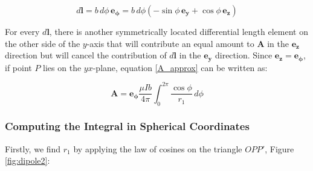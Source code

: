 \begin{equation}
    d\mathbf{l} = b \, d\phi \, \mathbf{e_\phi} 
    = b \, d\phi \left(- \sin\phi \, \mathbf{e_y} 
    + \cos\phi \, \mathbf{e_z}\right)
    \label{eq:dl}
\end{equation}

For every $d\mathbf{l}$, there is another 
symmetrically located differential length element on 
the other side of the $y$-axis that will contribute 
an equal amount to $\mathbf{A}$ in the $\mathbf{e_z}$ 
direction but will cancel the contribution of 
$d\mathbf{l}$ in the $\mathbf{e_y}$ direction. 
Since $\mathbf{e_z} = \mathbf{e_\phi}$, if point $P$ 
lies on the $yx$-plane, equation \ref{A_approx} can 
be written as:

\begin{equation}
    \mathbf{A} = \mathbf{e_\phi} \frac{\mu I b}{4 \pi} 
    \int_{0}^{2\pi} \frac{\cos \phi}{r_1} \, d\phi
    \label{eq:A_final}
\end{equation}

\subsubsection{Computing the Integral in Spherical Coordinates}

Firstly, we find $r_1$ by applying the law of cosines 
on the triangle $OPP'$, Figure \ref{fig:dipole2}:


